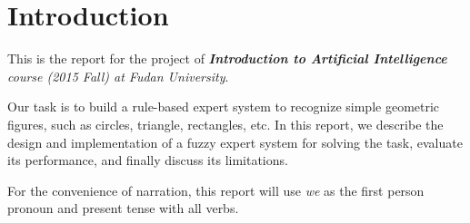 \section{Introduction}

This is the report for the project of \textit{\textbf{Introduction to Artificial Intelligence} course (2015 Fall) at Fudan University}.

Our task is to build a rule-based expert system to recognize simple geometric figures, such as circles, triangle, rectangles, etc. In this report, we describe the design and implementation of a fuzzy expert system for solving the task, evaluate its performance, and finally discuss its limitations.

For the convenience of narration, this report will use \textit{we} as the first person pronoun and present tense with all verbs.

